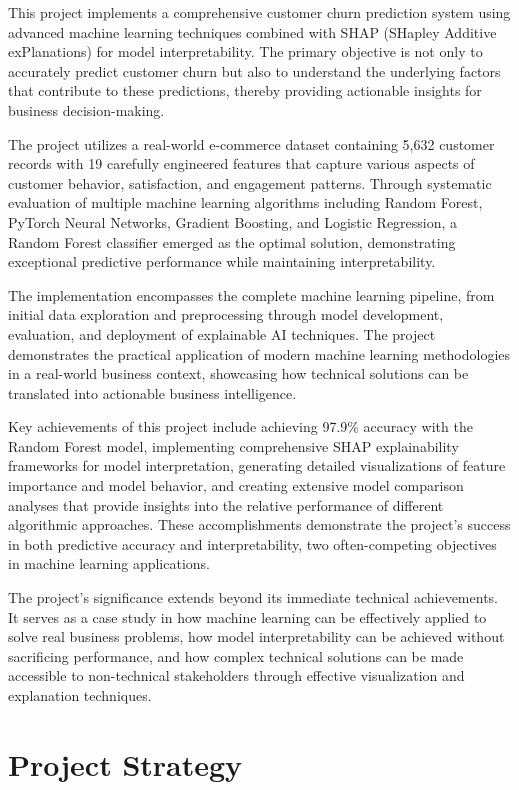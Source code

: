 \documentclass{article}
\begin{document}
This project implements a comprehensive customer churn prediction system using advanced machine learning techniques combined with SHAP (SHapley Additive exPlanations) for model interpretability. The primary objective is not only to accurately predict customer churn but also to understand the underlying factors that contribute to these predictions, thereby providing actionable insights for business decision-making.

The project utilizes a real-world e-commerce dataset containing 5,632 customer records with 19 carefully engineered features that capture various aspects of customer behavior, satisfaction, and engagement patterns. Through systematic evaluation of multiple machine learning algorithms including Random Forest, PyTorch Neural Networks, Gradient Boosting, and Logistic Regression, a Random Forest classifier emerged as the optimal solution, demonstrating exceptional predictive performance while maintaining interpretability.

The implementation encompasses the complete machine learning pipeline, from initial data exploration and preprocessing through model development, evaluation, and deployment of explainable AI techniques. The project demonstrates the practical application of modern machine learning methodologies in a real-world business context, showcasing how technical solutions can be translated into actionable business intelligence.

Key achievements of this project include achieving 97.9\% accuracy with the Random Forest model, implementing comprehensive SHAP explainability frameworks for model interpretation, generating detailed visualizations of feature importance and model behavior, and creating extensive model comparison analyses that provide insights into the relative performance of different algorithmic approaches. These accomplishments demonstrate the project's success in both predictive accuracy and interpretability, two often-competing objectives in machine learning applications.

The project's significance extends beyond its immediate technical achievements. It serves as a case study in how machine learning can be effectively applied to solve real business problems, how model interpretability can be achieved without sacrificing performance, and how complex technical solutions can be made accessible to non-technical stakeholders through effective visualization and explanation techniques.

\section{Project Strategy}
\end{document}
